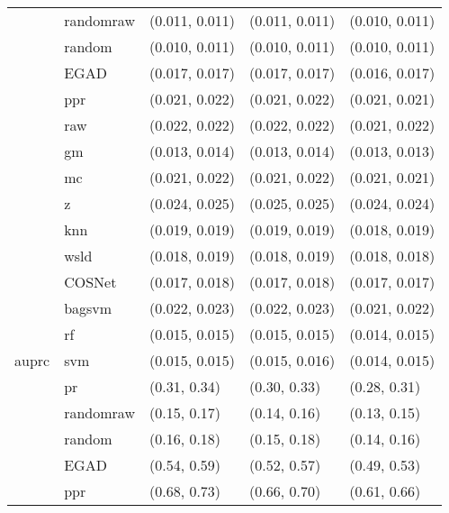 \begin{table}[H]
{\begin{tabular}{lllll}
 & randomraw & (0.011, 0.011) & (0.011, 0.011) & (0.010, 0.011)\\

 & random & (0.010, 0.011) & (0.010, 0.011) & (0.010, 0.011)\\

 & EGAD & (0.017, 0.017) & (0.017, 0.017) & (0.016, 0.017)\\

 & ppr & (0.021, 0.022) & (0.021, 0.022) & (0.021, 0.021)\\

 & raw & (0.022, 0.022) & (0.022, 0.022) & (0.021, 0.022)\\

 & gm & (0.013, 0.014) & (0.013, 0.014) & (0.013, 0.013)\\

 & mc & (0.021, 0.022) & (0.021, 0.022) & (0.021, 0.021)\\

 & z & (0.024, 0.025) & (0.025, 0.025) & (0.024, 0.024)\\

 & knn & (0.019, 0.019) & (0.019, 0.019) & (0.018, 0.019)\\

 & wsld & (0.018, 0.019) & (0.018, 0.019) & (0.018, 0.018)\\

 & COSNet & (0.017, 0.018) & (0.017, 0.018) & (0.017, 0.017)\\

 & bagsvm & (0.022, 0.023) & (0.022, 0.023) & (0.021, 0.022)\\

 & rf & (0.015, 0.015) & (0.015, 0.015) & (0.014, 0.015)\\

\multirow{-15}{*}{\raggedright\arraybackslash auprc} & svm & (0.015, 0.015) & (0.015, 0.016) & (0.014, 0.015)\\
\cmidrule{1-5}
 & pr & (0.31, 0.34) & (0.30, 0.33) & (0.28, 0.31)\\

 & randomraw & (0.15, 0.17) & (0.14, 0.16) & (0.13, 0.15)\\

 & random & (0.16, 0.18) & (0.15, 0.18) & (0.14, 0.16)\\

 & EGAD & (0.54, 0.59) & (0.52, 0.57) & (0.49, 0.53)\\

 & ppr & (0.68, 0.73) & (0.66, 0.70) & (0.61, 0.66)\\


\end{tabular}}
\end{table}
